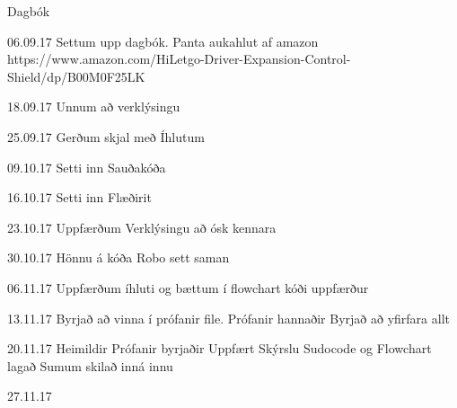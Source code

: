 Dagbók

06.09.17
Settum upp dagbók. Panta aukahlut af amazon https://www.amazon.com/HiLetgo-Driver-Expansion-Control-Shield/dp/B00M0F25LK

18.09.17
Unnum að verklýsingu

25.09.17
Gerðum skjal með Íhlutum

09.10.17
Setti inn Sauðakóða

16.10.17
Setti inn Flæðirit

23.10.17
Uppfærðum Verklýsingu að ósk kennara

30.10.17
Hönnu á kóða
Robo sett saman

06.11.17
Uppfærðum íhluti og bættum í flowchart
kóði uppfærður

13.11.17
Byrjað að vinna í prófanir file.
Prófanir hannaðir 
Byrjað að yfirfara allt

20.11.17 
Heimildir
Prófanir byrjaðir
Uppfært Skýrslu
Sudocode og Flowchart lagað
Sumum skilað inná innu

27.11.17


